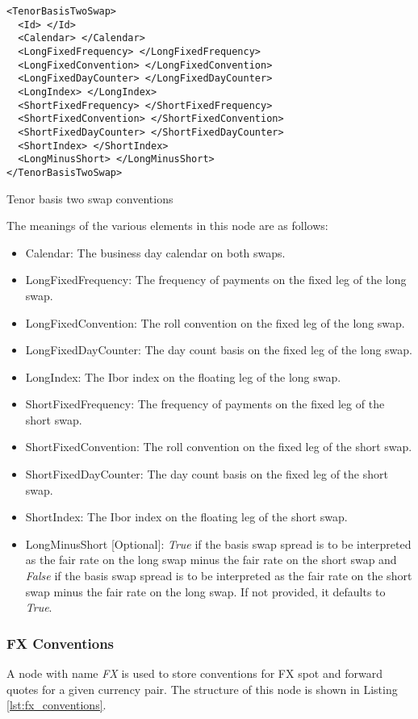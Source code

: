 \begin{listing}[H]
\begin{verbatim}
<TenorBasisTwoSwap>
  <Id> </Id>
  <Calendar> </Calendar>
  <LongFixedFrequency> </LongFixedFrequency>
  <LongFixedConvention> </LongFixedConvention>
  <LongFixedDayCounter> </LongFixedDayCounter>
  <LongIndex> </LongIndex>
  <ShortFixedFrequency> </ShortFixedFrequency>
  <ShortFixedConvention> </ShortFixedConvention>
  <ShortFixedDayCounter> </ShortFixedDayCounter>
  <ShortIndex> </ShortIndex>
  <LongMinusShort> </LongMinusShort>
</TenorBasisTwoSwap>
\end{verbatim}
\caption{Tenor basis two swap conventions}
\label{lst:tenor_basis_two_conventions}
\end{listing}

The meanings of the various elements in this node are as follows:
\begin{itemize}
\item Calendar: The business day calendar on both swaps.
\item LongFixedFrequency: The frequency of payments on the fixed leg of the long swap.
\item LongFixedConvention: The roll convention on the fixed leg of the long swap.
\item LongFixedDayCounter: The day count basis on the fixed leg of the long swap.
\item LongIndex: The Ibor index on the floating leg of the long swap.
\item ShortFixedFrequency: The frequency of payments on the fixed leg of the short swap.
\item ShortFixedConvention: The roll convention on the fixed leg of the short swap.
\item ShortFixedDayCounter: The day count basis on the fixed leg of the short swap.
\item ShortIndex: The Ibor index on the floating leg of the short swap.
\item LongMinusShort [Optional]: \emph{True} if the basis swap spread is to be interpreted as the fair rate on the long
swap minus the fair rate on the short swap and \emph{False} if the basis swap spread is to be interpreted as the fair
rate on the short swap minus the fair rate on the long swap. If not provided, it defaults to \emph{True}.
\end{itemize}

\subsubsection{FX Conventions}\label{sss:fx_convention}
A node with name \emph{FX} is used to store conventions for FX spot and forward quotes for a given currency pair. The
structure of this node is shown in Listing \ref{lst:fx_conventions}.

